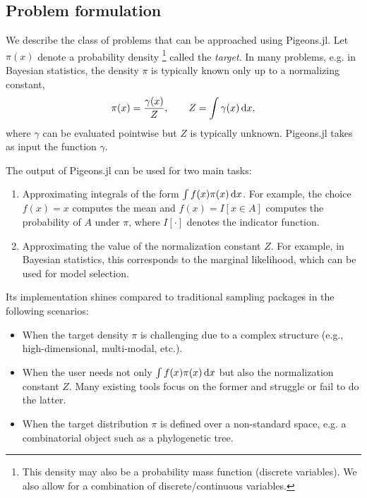 \subsection{Problem formulation}
We describe the class of problems that can be approached using Pigeons.jl.
Let $\pi(x)$ denote a probability density
\footnote{This density may also be a probability mass function 
(discrete variables). We also allow for a combination of discrete/continuous variables.} 
called the \emph{target}. 
In many problems, e.g. in Bayesian statistics, the density $\pi$ is typically 
known only up to a normalizing constant, 
\[
\label{eq:normalizing_constant}
  \pi(x) = \frac{\gamma(x)}{Z}, \qquad Z = \int \gamma(x) \, \dee x,
\]  
where $\gamma$ can be evaluated pointwise but $Z$ is typically unknown.
Pigeons.jl takes as input the function $\gamma$.

\medskip 
The output of Pigeons.jl can be used for two main tasks:
\begin{enumerate}
    \item Approximating integrals of the form $\int f(x) \pi(x) \, \mathrm{d} x$.  
    For example, the choice $f(x) = x$ computes the mean and 
    $f(x) = I[x \in A]$ computes the probability of $A$ under $\pi$,
    where $I[\cdot]$ denotes the indicator function.

    \item Approximating the value of the normalization constant $Z$. For 
    example, in Bayesian statistics, this corresponds to the 
    marginal likelihood, which can be used for model selection. 
\end{enumerate}
Its implementation shines compared to traditional sampling packages in the 
following scenarios:
\begin{itemize}
    \item When the target density $\pi$ is challenging due to a complex structure 
    (e.g., high-dimensional, multi-modal, etc.).
    
    \item When the user needs not only $\int f(x) \pi(x) \, \mathrm{d} x$ but also
    the normalization constant $Z$. 
    Many existing tools focus on the former and struggle or fail to do the latter. 
    
    \item When the target distribution $\pi$ is defined over a non-standard space, 
    e.g. a combinatorial object such as a phylogenetic tree.  
\end{itemize}


